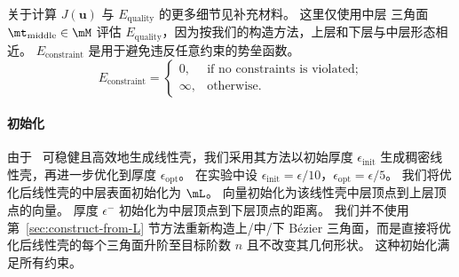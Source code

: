 关于计算 $J(\mathbf{u})$ 与 $E_\text{quality}$ 的更多细节见补充材料。
这里仅使用中层 \Bezier 三角面 $\mt_\text{middle} \in \mM$ 评估 $E_{\text{quality}}$，因为按我们的构造方法，上层和下层与中层形态相近。
%
$E_\text{constraint}$ 是用于避免违反任意约束的势垒函数。
\begin{equation}\label{equ:constraint}
    E_\text{constraint} =
    \begin{cases}
        0,      &\text{if no constraints is violated;}  \\
	 	\infty, &\text{otherwise.}
    \end{cases}
\end{equation}

\paragraph{初始化}
由于~\cite{Jiang2020BijectivePI} 可稳健且高效地生成线性壳，我们采用其方法以初始厚度 $\epsilon_\text{init}$ 生成稠密线性壳，再进一步优化到厚度 $\epsilon_\text{opt}$。
在实验中设 $\epsilon_\text{init} = \epsilon/10$，$\epsilon_\text{opt} = \epsilon/5$。
我们将优化后线性壳的中层表面初始化为 $\mL$。
向量初始化为该线性壳中层顶点到上层顶点的向量。
厚度 $\epsilon^{-}$ 初始化为中层顶点到下层顶点的距离。
我们并不使用第~\ref{sec:construct-from-L} 节方法重新构造上/中/下 B\'{e}zier 三角面，而是直接将优化后线性壳的每个三角面升阶至目标阶数 $n$ 且不改变其几何形状。
这种初始化满足所有约束。


